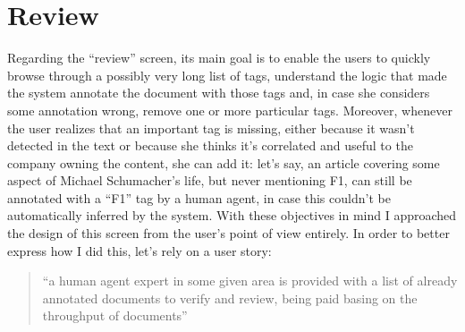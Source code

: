 \documentclass[12pt,svgnames]{memoir}
\newenvironment{quotationb}%
{\color{maincolor}\begin{leftbar}\begin{quotation}}%
{\end{quotation}\end{leftbar}\ignorespacesafterend}
\begin{document}
\section{Review}\label{review-1}

Regarding the ``review'' screen, its main goal is to enable the users to
quickly browse through a possibly very long list of tags, understand the
logic that made the system annotate the document with those tags and, in
case she considers some annotation wrong, remove one or more particular
tags. Moreover, whenever the user realizes that an important tag is
missing, either because it wasn't detected in the text or because she
thinks it's correlated and useful to the company owning the content, she
can add it: let's say, an article covering some aspect of Michael
Schumacher's life, but never mentioning F1, can still be annotated with
a ``F1'' tag by a human agent, in case this couldn't be automatically
inferred by the system. With these objectives in mind I approached the
design of this screen from the user's point of view entirely. In order
to better express how I did this, let's rely on a user story:

\begin{quotationb}
``a human agent expert in some given area is provided with a list of
already annotated documents to verify and review, being paid basing on
the throughput of documents''
\end{quotationb}
\end{document}
